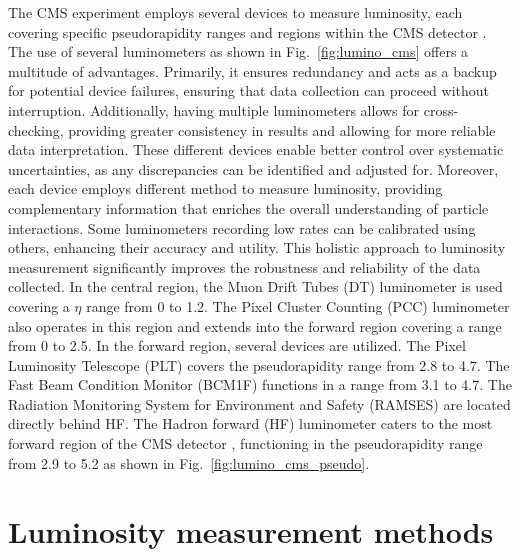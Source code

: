 The CMS experiment employs several devices to measure luminosity, each covering specific pseudorapidity ranges and regions within the CMS detector \cite{pas_18}. The use of several luminometers as shown in Fig.~\ref{fig:lumino_cms} offers a multitude of advantages. Primarily, it ensures redundancy and acts as a backup for potential device failures, ensuring that data collection can proceed without interruption. Additionally, having multiple luminometers allows for cross-checking, providing greater consistency in results and allowing for more reliable data interpretation. These different devices enable better control over systematic uncertainties, as any discrepancies can be identified and adjusted for. Moreover, each device employs different method to measure luminosity, providing complementary information that enriches the overall understanding of particle interactions. Some luminometers recording low rates can be calibrated using others, enhancing their accuracy and utility. This holistic approach to luminosity measurement significantly improves the robustness and reliability of the data collected. In the central region, the Muon Drift Tubes (DT) luminometer is used covering a $\eta$ range from 0 to 1.2. The Pixel Cluster Counting (PCC) luminometer also operates in this region and extends into the forward region covering a range from 0 to 2.5. In the forward region, several devices are utilized. The Pixel Luminosity Telescope (PLT) covers the pseudorapidity range from 2.8 to 4.7. The Fast Beam Condition Monitor (BCM1F) functions in a range from 3.1 to 4.7. The Radiation Monitoring System for Environment and Safety (RAMSES) are located directly behind HF. The Hadron forward (HF) luminometer caters to the most forward region of the CMS detector \cite{Sirunyan:2759951}, functioning in the pseudorapidity range from 2.9 to 5.2 as shown in Fig.~\ref{fig:lumino_cms_pseudo}.


\section{Luminosity measurement methods}


